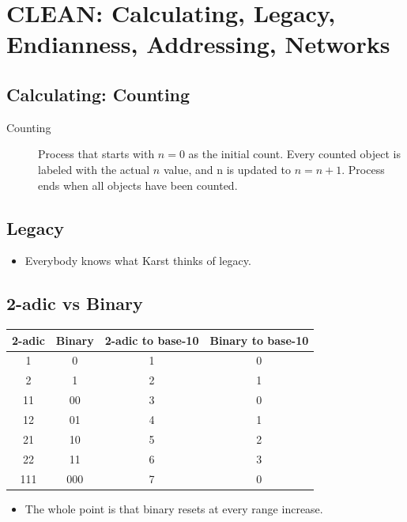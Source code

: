 \documentclass{article}
\begin{document}
\section{CLEAN: Calculating, Legacy, Endianness, Addressing, Networks}

\subsection{Calculating: Counting}

\begin{description}
	\item[Counting] Process that starts with $n=0$ as the initial count. Every counted object is labeled with the actual $n$ value, and n is updated to $n=n+1$. Process ends when all objects have been counted.
\end{description}
	
	
\subsection{Legacy}

\begin{itemize}
	\item Everybody knows what Karst thinks of legacy.
\end{itemize}


\subsection{2-adic vs Binary}

\begin{center}
  \begin{tabular}{ | c | c | c | c | }
    2-adic & Binary & 2-adic to base-10 & Binary to base-10 \\ \hline
    1 & 0 & 1 & 0 \\ \hline
    2 & 1 & 2 & 1 \\ \hline
    11 & 00 & 3 & 0 \\ \hline
    12 & 01 & 4 & 1 \\ \hline
    21 & 10 & 5 & 2 \\ \hline
    22 & 11 & 6 & 3 \\ \hline
    111 & 000 & 7 & 0 \\ 
    \hline
  \end{tabular}
\end{center}

\begin{itemize}
	\item The whole point is that binary resets at every range increase.
\end{itemize}
\end{document}
